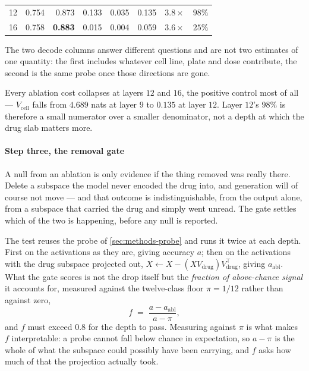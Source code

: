 \begin{table}[htbp]
\begin{fullwidth}
\begin{threeparttable}
\begin{tabular}{@{}lrrrrrrr@{}}
    12 & 0.754 & 0.873 & 0.133 & 0.035 & 0.135 & $3.8\times$  & $98\%$ \\
    16 & 0.758 & \textbf{0.883} & 0.015 & 0.004 & 0.059 & $3.6\times$ & $25\%$ \\
    \bottomrule
    \end{tabular}
    \begin{tablenotes}[flushleft]\footnotesize
    \item The two decode columns answer different questions and are not two
    estimates of one quantity: the first includes whatever cell line, plate and
    dose contribute, the second is the same probe once those directions are gone.
    \item Every ablation cost collapses at layers $12$ and $16$, the positive
    control most of all --- $V_{\textrm{cell}}$ falls from $4.689$ nats at layer
    $9$ to $0.135$ at layer $12$. Layer $12$'s $98\%$ is therefore a small
    numerator over a smaller denominator, not a depth at which the drug slab
    matters more.
    \end{tablenotes}
  \end{threeparttable}
  \end{fullwidth}
  \end{table}
\paragraph{Step three, the removal gate} A null from an ablation is only
evidence if the thing removed was really there. Delete a subspace the model
never encoded the drug into, and generation will of course not move --- and
that outcome is indistinguishable, from the output alone, from a subspace that
carried the drug and simply went unread. The gate settles which of the two is
happening, before any null is reported.

The test reuses the probe of \cref{sec:methods-probe} and runs it twice at each
depth. First on the activations as they are, giving accuracy $a$; then on the
activations with the drug subspace projected out, $X \leftarrow X - (X
V_{\textrm{drug}})V_{\textrm{drug}}^{\top}$, giving $a_{\textrm{abl}}$. What the
gate scores is not the drop itself but the \emph{fraction of above-chance
signal} it accounts for, measured against the twelve-class floor $\pi = 1/12$
rather than against zero,
\begin{equation}
  f \;=\; \frac{a - a_{\textrm{abl}}}{a - \pi} ,
\end{equation}
and $f$ must exceed $0.8$ for the depth to pass. Measuring against $\pi$ is what
makes $f$ interpretable: a probe cannot fall below chance in expectation, so
$a - \pi$ is the whole of what the subspace could possibly have been carrying,
and $f$ asks how much of that the projection actually took.

